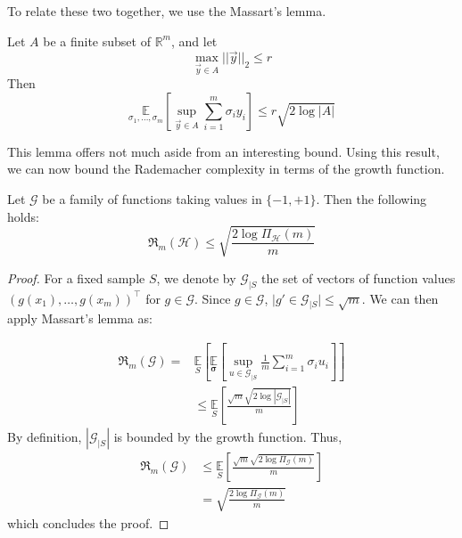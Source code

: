 To relate these two together, we use the Massart's lemma. 
\begin{lemma}
    Let $A$ be a finite subset of $\mathbb{R}^{m}$, and let $$\max_{\vec{y}\in A} \lvert\lvert \vec{y}\rvert\rvert_{2} \leq r$$
    Then 
    \begin{equation}
        \underset{\sigma_{1},\dots,\sigma_{m}}{\mathbb{E}} \left[\sup_{\vec{y}\in A} \sum^{m}_{i=1}\sigma_{i} y_{i} \right] \leq r \sqrt{2\log{\lvert A \rvert}}
    \end{equation}
\end{lemma}
This lemma offers not much aside from an interesting bound. Using this result, we can now bound the Rademacher complexity in terms of the growth function. 
\begin{col}
    Let $\mathcal{G}$ be a family of functions taking values in $\{-1, + 1\}$. Then the following holds: 
    \begin{equation}
        \mathfrak{R}_{m}(\mathcal{H}) \leq \sqrt{\frac{2\log{\Pi_{\mathcal{H}}(m)}}{m}}
    \end{equation}
\end{col}
\begin{proof}
    For a fixed sample $S$, we denote by $\mathcal{G}_{|S}$ the set of vectors of function values $(g(x_1),\dots,g(x_m))^{\top}$ for $g\in \mathcal{G}$. Since $g\in \mathcal{G}$, $\lvert g'\in \mathcal{G}_{|S} \rvert \leq \sqrt{m}$. We can then apply Massart's lemma as: 

    \begin{equation}
        \begin{split}
            \mathfrak{R}_{m}(\mathcal{G}) =& \underset{S}{\mathbb{E}} \left[ \underset{\bm{\sigma}}{\mathbb{E}} \left[ \sup_{u\in \mathcal{G}_{|S}} \frac{1}{m} \sum^{m}_{i=1} \sigma_{i} u_{i} \right] \right]\\
            & \leq \underset{S}{\mathbb{E}} \left[\frac{\sqrt{m}\sqrt{2\log{|\mathcal{G}_{|S}|}}}{m}\right]
        \end{split}
    \end{equation}
    By definition, $|\mathcal{G}_{|S}|$ is bounded by the growth function. Thus, 
    \begin{equation}
        \begin{split}
            \mathfrak{R}_{m}(\mathcal{G}) &\leq \underset{S}{\mathbb{E}} \left[\frac{\sqrt{m}\sqrt{2\log{\Pi_{\mathcal{G}}(m) }}}{m}\right] \\
            & = \sqrt{\frac{2\log{\Pi_{\mathcal{G}} (m)}}{m}}
        \end{split}
    \end{equation}
    which concludes the proof. 
\end{proof}
